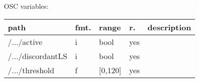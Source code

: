 \begin{snugshade}
{\footnotesize
\label{osctab:tascaraplookatme}
OSC variables:
\nopagebreak

\begin{tabularx}{\textwidth}{llllX}
\hline
path & fmt. & range & r. & description\\
\hline
/.../active & i & bool & yes & \\
/.../discordantLS & i & bool & yes & \\
/.../threshold & f & [0,120] & yes & \\
\hline
\end{tabularx}
}
\end{snugshade}
